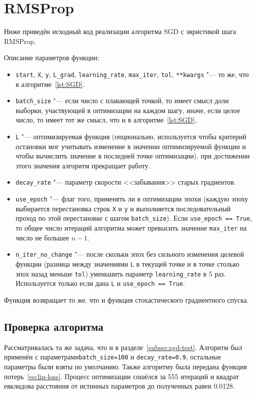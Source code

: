 \documentclass{article}
\begin{document}
\section{RMSProp}
Ниже приведён исходный код реализации алгоритма SGD с эвристикой шага RMSProp.

Описание параметров функции:
\begin{itemize}
  \item \verb|start|, \verb|X|, \verb|y|, \verb|L_grad|,
    \verb|learning_rate|, \verb|max_iter|, \verb|tol|, \verb|**kwargs| "---
    то же, что в алгоритме~\ref{lst:SGD}.
  \item \verb|batch_size| "--- если число с плавающей точкой, то имеет смысл
    доли выборки, участвующей в оптимизации на каждом шагу, иначе, если целое число, то
    имеет тот же смысл, что и в алгоритме~\ref{lst:SGD},
  \item \verb|L| "--- оптимизируемая функция (опционально, используется
    чтобы критерий остановки мог учитывать изменение в значении оптимизируемой функции и чтобы вычислить значение в последней точке оптимизации).
    при достижении этого значения алгоритм прекращает работу.
  \item \verb|decay_rate| "--- параметр скорости <<забывания>> старых градиентов.
  \item \verb|use_epoch| "--- флаг того, применять ли в оптимизации эпохи (каждую эпоху
      выбирается перестановка строк \verb|X| и \verb|y| и выполняется последовательный проход
    по этой перестановке с шагом \verb|batch_size|). Если \verb|use_epoch == True|,
    то общее число итераций алгоритма может превысить значение \verb|max_iter| на число
    не большее $n-1$.
  \item \verb|n_iter_no_change| "--- после скольки эпох без сильного изменения целевой функции
    (разница между значениями \verb|L| в текущей точке и в точке столько эпох назад меньше
    \verb|tol|) уменьшить параметр \verb|learning_rate| в 5 раз. Используется только если дана
    \verb|L| и \verb|use_epoch == True|.
\end{itemize}
Функция возвращает то же, что и функция стохастического градиентного спуска.

\subsection{Проверка алгоритма}\label{subsec:rmsprop-test}
Рассматривалась та же задача, что и в разделе~\ref{subsec:sgd-test}.
Алгоритм был применён с параметрами\linebreak \verb|batch_size=100| и
\verb|decay_rate=0.9|, остальные параметры были взяты по умолчанию.
Также алгоритму была передана функция потерь~\eqref{eq:lin-loss}.
Процесс оптимизации сошёлся за 555 итераций и квадрат евклидова расстояния
от истинных параметров до полученных равен 0.0128.
\end{document}

